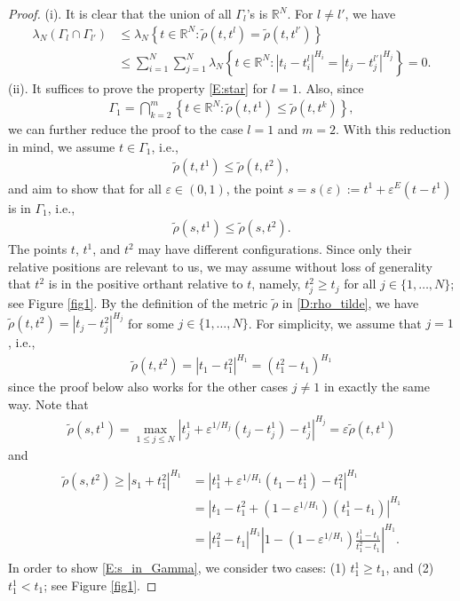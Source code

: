 \documentclass[11pt, reqno]{amsart}
\def\R{{\mathbb R}}
\numberwithin{equation}{section}
\begin{document}
\begin{proof}
(i). It is clear that the union of all $\Gamma_l$'s is $\R^N$. For $l \ne l'$, we have
\begin{align*}
\lambda_N(\Gamma_l \cap \Gamma_{l'}) &\le \lambda_N\left\{ t \in \R^N : \tilde\rho(t, t^l) = \tilde\rho(t, t^{l'})\right\}\\
& \le \sum_{i=1}^N \sum_{j=1}^N \lambda_N\left\{ t \in \R^N : |t_i-t^l_i|^{H_i} = |t_j - t^{l'}_j|^{H_j} \right\} = 0.
\end{align*}
(ii). It suffices to prove the property \eqref{E:star} for $l = 1$. Also, since
\begin{align*}
\Gamma_1 = \bigcap_{k=2}^m \left\{ t \in \R^N : \tilde\rho(t, t^1) \le \tilde\rho(t, t^k) \right\},
\end{align*}
we can further reduce the proof to the case $l = 1$ and $m = 2$.
With this reduction in mind, we assume $t \in \Gamma_1$, i.e.,
\begin{align}\label{E:t_in_Gamma}
\tilde\rho(t, t^1) \le \tilde\rho(t, t^2),
\end{align}
and aim to show that for all $\varepsilon \in (0, 1)$, the point $s = s(\varepsilon) := t^1 + \varepsilon^E (t-t^1)$ is in $\Gamma_1$, 
i.e.,
\begin{align}\label{E:s_in_Gamma}
\tilde\rho(s, t^1) \le \tilde\rho(s, t^2).
\end{align}
The points $t$, $t^1$, and $t^2$ may have different configurations.
Since only their relative positions are relevant to us, we may assume without loss of generality that $t^2$ is in the 
positive orthant relative to $t$, namely, $t^2_j \ge t_j$ for all $j \in \{ 1, \dots, N\}$; see Figure \ref{fig1}.
By the definition of the metric $\tilde\rho$ in \eqref{D:rho_tilde}, we have $\tilde\rho(t, t^2) = |t_j-t^2_j|^{H_j}$ for some 
$j \in \{1, \dots, N\}$. For simplicity, we assume that $j = 1$, i.e.,
\begin{align}\label{E:rho_t_t2}
\tilde\rho(t, t^2) = |t_1 - t^2_1|^{H_1} = (t^2_1 - t_1)^{H_1}
\end{align}
since the proof below also works for the other cases $j \ne 1$ in exactly the same way.
Note that
\begin{align}\label{E:rho_s_t1}
\tilde\rho(s, t^1) = \max_{1 \le j \le N} |t^1_j + \varepsilon^{1/H_j}(t_j-t^1_j) - t^1_j|^{H_j} = \varepsilon \tilde\rho(t, t^1)
\end{align}
and
\begin{align}\label{E:rho_s_t2}\begin{split}
\tilde\rho(s, t^2) \ge |s_1 + t^2_1|^{H_1}
& = |t^1_1+\varepsilon^{1/H_1}(t_1-t^1_1) - t^2_1|^{H_1}\\
& = |t_1-t^2_1 + (1-\varepsilon^{1/H_1}) (t^1_1 - t_1)|^{H_1}\\
& = |t^2_1 - t_1|^{H_1} \left| 1 - (1-\varepsilon^{1/H_1}) \frac{t^1_1-t_1}{t^2_1-t_1} \right|^{H_1}.
\end{split}\end{align}
In order to show \eqref{E:s_in_Gamma}, we consider two cases: (1) $t_1^1 \ge t_1$, and (2) $t_1^1 < t_1$; see Figure \ref{fig1}.


\end{proof}
\end{document}
